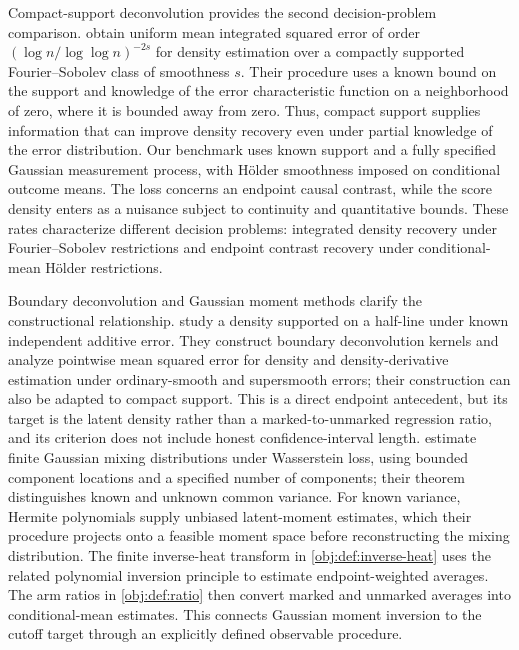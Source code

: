 \documentclass[11pt]{article}
\begin{document}
Compact-support deconvolution provides the second decision-problem comparison. \citet[Theorem~1(a), fixed-support case]{Meister2007CompactSupport} obtain uniform mean integrated squared error of order \((\log n/\log\log n)^{-2s}\) for density estimation over a compactly supported Fourier--Sobolev class of smoothness \(s\). Their procedure uses a known bound on the support and knowledge of the error characteristic function on a neighborhood of zero, where it is bounded away from zero. Thus, compact support supplies information that can improve density recovery even under partial knowledge of the error distribution. Our benchmark uses known support and a fully specified Gaussian measurement process, with Hölder smoothness imposed on conditional outcome means. The loss concerns an endpoint causal contrast, while the score density enters as a nuisance subject to continuity and quantitative bounds. These rates characterize different decision problems: integrated density recovery under Fourier--Sobolev restrictions and endpoint contrast recovery under conditional-mean Hölder restrictions.

Boundary deconvolution and Gaussian moment methods clarify the constructional relationship. \citet{ZhangKarunamuni2009Boundary} study a density supported on a half-line under known independent additive error. They construct boundary deconvolution kernels and analyze pointwise mean squared error for density and density-derivative estimation under ordinary-smooth and supersmooth errors; their construction can also be adapted to compact support. This is a direct endpoint antecedent, but its target is the latent density rather than a marked-to-unmarked regression ratio, and its criterion does not include honest confidence-interval length. \citet[Theorem~1; Section~4.1]{WuYang2020DenoisedMoments} estimate finite Gaussian mixing distributions under Wasserstein loss, using bounded component locations and a specified number of components; their theorem distinguishes known and unknown common variance. For known variance, Hermite polynomials supply unbiased latent-moment estimates, which their procedure projects onto a feasible moment space before reconstructing the mixing distribution. The finite inverse-heat transform in \cref{obj:def:inverse-heat} uses the related polynomial inversion principle to estimate endpoint-weighted averages. The arm ratios in \cref{obj:def:ratio} then convert marked and unmarked averages into conditional-mean estimates. This connects Gaussian moment inversion to the cutoff target through an explicitly defined observable procedure.
\end{document}
